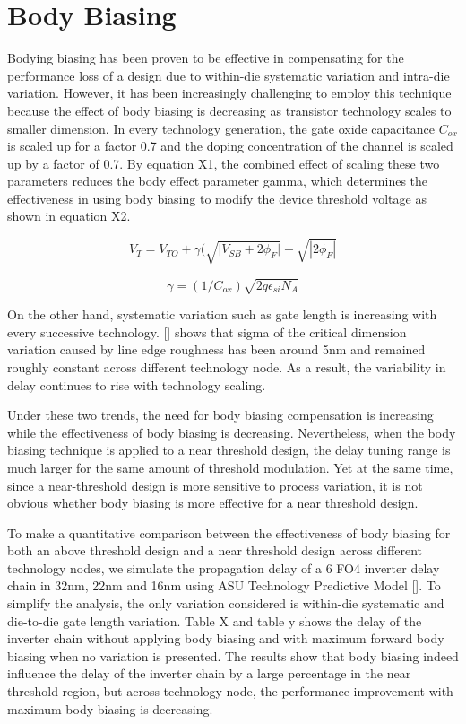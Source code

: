 \section{Body Biasing}
\label{sec:bodybiasing}

Bodying biasing has been proven to be effective in compensating for the
performance loss of a design due to within-die systematic variation and
intra-die variation. However, it has been increasingly challenging to employ
this technique because the effect of body biasing is decreasing as transistor
technology scales to smaller dimension. In every technology generation, the gate
oxide capacitance $C_{ox}$ is scaled up for a factor 0.7 and the doping
concentration of the channel is scaled up by a factor of 0.7. By equation X1,
the combined effect of scaling these two parameters reduces the body effect
parameter gamma, which determines the effectiveness in using body biasing to
modify the device threshold voltage as shown in equation X2.

\begin{equation}
V_{T} = V_{TO} + \gamma ( \sqrt{ | {V_{SB} + 2\phi_{F} | } } - \sqrt{ | 2\phi_{F} | } 
\end{equation}

\begin{equation}
\gamma = (1/C_{ox})\sqrt{2q\epsilon_{si}N_A}
\end{equation}

On the other hand, systematic variation such as gate length is increasing with
every successive technology. [] shows that sigma of the critical dimension
variation caused by line edge roughness has been around 5nm and remained roughly
constant across different technology node. As a result, the variability in delay
continues to rise with technology scaling. 

Under these two trends, the need for body biasing compensation is increasing
while the effectiveness of body biasing is decreasing. Nevertheless, when the
body biasing technique is applied to a near threshold design, the delay tuning
range is much larger for the same amount of threshold modulation. Yet at the
same time, since a near-threshold design is more sensitive to process variation,
it is not obvious whether body biasing is more effective for a near threshold
design. 

To make a quantitative comparison between the effectiveness of body biasing for
both an above threshold design and a near threshold design across different
technology nodes,  we simulate the propagation  delay of a 6 FO4 inverter delay
chain in 32nm, 22nm and 16nm using ASU Technology Predictive Model []. To
simplify the analysis, the only variation considered is within-die systematic
and die-to-die gate length variation. Table X and table y shows the delay of the
inverter chain  without applying body biasing and with maximum forward body
biasing when no variation is presented. The results show that body biasing
indeed influence the delay of the inverter chain by a large percentage in the
near threshold region, but across technology node, the performance improvement
with maximum body biasing is decreasing.   

